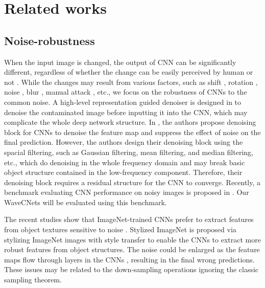 \documentclass[10pt,twocolumn,letterpaper]{article}
\begin{document}
\section{Related works}
\subsection{Noise-robustness}
When the input image is changed, the output of CNN can be significantly different,
regardless of whether the change can be easily perceived by human or not
\cite{goodfellow2014explaining, geirhos2018imagenet, liao2018defense, xie2019feature}.
While the changes may result from various factors,
such as shift \cite{zhang2019making,mairal2014convolutional}, rotation \cite{bruna2013invariant_scatnet},
noise \cite{xie2019feature}, blur \cite{hendrycks2019benchmarking}, manual attack \cite{goodfellow2014explaining}, etc.,
we focus on the robustness of CNNs to the common noise.
A high-level representation guided denoiser is designed in \cite{liao2018defense}
to denoise the contaminated image before inputting it into the CNN,
which may complicate the whole deep network structure.
In \cite{xie2019feature}, the authors propose denoising block for CNNs to denoise the feature map
and suppress the effect of noise on the final prediction.
However, the authors design their denoising block using the spacial filtering,
such as Gaussian filtering, mean filtering, and median filtering, etc.,
which do denoising in the whole frequency domain
and may break basic object structure contained in the low-frequency component.
Therefore, their denoising block requires a residual structure for the CNN to converge.
Recently, a benchmark evaluating CNN performance on noisy images is proposed in \cite{hendrycks2019benchmarking}.
Our WaveCNets will be evaluated using this benchmark.

The recent studies show that ImageNet-trained CNNs prefer to extract features from object textures
sensitive to noise \cite{brendel2019approximating, geirhos2018imagenet}.
Stylized ImageNet \cite{geirhos2018imagenet} is proposed via stylizing ImageNet images with style transfer
to enable the CNNs to extract more robust features from object structures.
The noise could be enlarged as the feature maps flow through layers in the CNNs \cite{liao2018defense, xie2019feature},
resulting in the final wrong predictions.
These issues may be related to the down-sampling operations ignoring the classic sampling theorem.%
\end{document}
